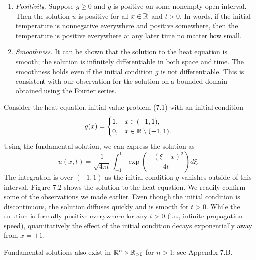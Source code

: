 \begin{enumerate}
    \[u(x, t) \approx \frac{1}{\sqrt{4\pi t}} \int_{\xi=x-C\sqrt{t}}^{x+C\sqrt{t}} \exp\left(\frac{-(\xi - x)^2}{4t}\right) g(\xi)\,d\xi.\]
    \item \textit{Positivity.} Suppose $g \geq 0$ and $g$ is positive on some nonempty open interval. Then the solution $u$ is positive for all $x \in \mathbb{R}$ and $t > 0$. In words, if the initial temperature is nonnegative everywhere and positive somewhere, then the temperature is positive everywhere at any later time no matter how small.
    \item \textit{Smoothness.} It can be shown that the solution to the heat equation is smooth; the solution is infinitely differentiable in both space and time. The smoothness holds even if the initial condition $g$ is not differentiable. This is consistent with our observation for the solution on a bounded domain obtained using the Fourier series.
\end{enumerate}

\begin{example}
    Consider the heat equation initial value problem (7.1) with an initial condition
    \[g(x) = \begin{cases} 1, & x \in (-1, 1), \\ 0, & x \in \mathbb{R} \setminus (-1, 1). \end{cases}\]
    Using the fundamental solution, we can express the solution as
    \[u(x, t) = \frac{1}{\sqrt{4\pi t}} \int_{-1}^{1} \exp\left(\frac{-(\xi - x)^2}{4t}\right) d\xi.\]
    The integration is over $(-1, 1)$ as the initial condition $g$ vanishes outside of this interval. Figure 7.2 shows the solution to the heat equation. We readily confirm some of the observations we made earlier. Even though the initial condition is discontinuous, the solution diffuses quickly and is smooth for $t > 0$. While the solution is formally positive everywhere for any $t > 0$ (i.e., infinite propagation speed), quantitatively the effect of the initial condition decays exponentially away from $x = \pm 1$.
\end{example}


\begin{nremark}[][7.8]
    Fundamental solutions also exist in $\mathbb{R}^n \times \mathbb{R}_{>0}$ for $n > 1$; see Appendix 7.B.
\end{nremark}

